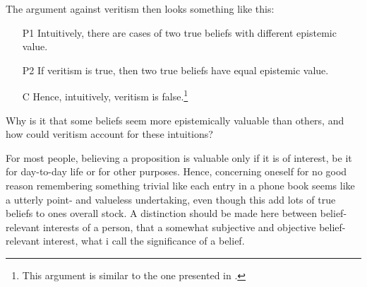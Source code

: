 \documentclass[12pt,numbers=noenddot]{scrartcl}
\begin{document}
The argument against veritism then looks something like this:

\begin{enumerate}
    \item[P1] Intuitively, there are cases of two true beliefs with different epistemic value.
    \item[P2] If veritism is true, then two true beliefs have equal epistemic value.
    \item[C] Hence, intuitively, veritism is false.\footnote{This argument is similar to the one presented in \textcite{Hu2016-HUWDT}.}
\end{enumerate}

Why is it that some beliefs seem more epistemically valuable than others, and how could veritism account for these intuitions?

For most people, believing a proposition is valuable only if it is of interest, be it for day-to-day life or for other purposes. Hence, concerning oneself for no good reason remembering something trivial like each entry in a phone book seems like a utterly point- and valueless undertaking, even though this add lots of true beliefs to ones overall stock. A distinction should be made here between belief-relevant interests of a person, that a somewhat subjective and objective belief-relevant interest, what i call the significance of a belief.
\end{document}
